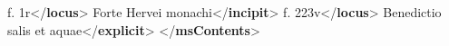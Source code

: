 \begin{shaded}
\hspace*{1em}\hspace*{1em}f. 1r{</\textbf{locus}>} Forte Hervei monachi{</\textbf{incipit}>}\mbox{}\newline 
\hspace*{1em}\mbox{}\newline 
\hspace*{1em}\hspace*{1em}f. 223v{</\textbf{locus}>} Benedictio salis et aquae{</\textbf{explicit}>}\mbox{}\newline 
{}\mbox{}\newline 
{</\textbf{msContents}>}\end{shaded}\egroup\par \par

